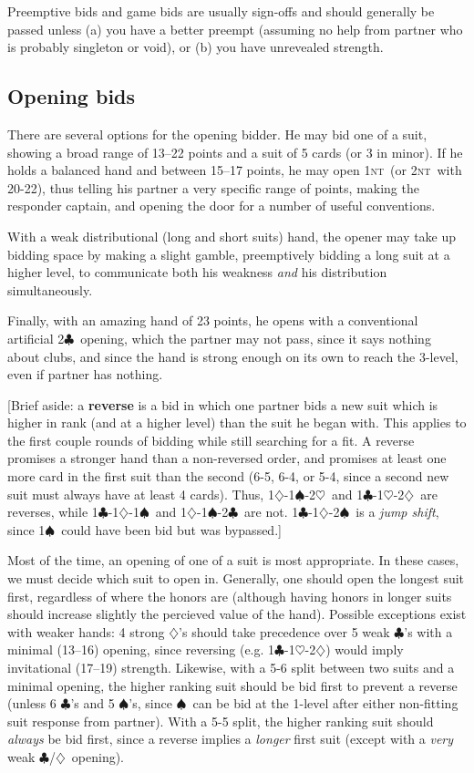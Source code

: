 \documentclass[11pt]{article}
\def\C{$\clubsuit$}
\def\D{$\diamondsuit$}
\def\H{$\heartsuit$}
\def\S{$\spadesuit$}
\def\NT{\textsc{nt}}
\begin{document}
Preemptive bids and game bids are usually sign-offs and should generally
be passed unless (a) you have a better preempt (assuming no
help from partner who is probably singleton or void), or (b) you have
unrevealed strength.

\subsection{Opening bids}
There are several options for the opening bidder.  He may bid one of a
suit, showing a broad range of 13--22 points and a suit of 5 cards (or
3 in minor).  If he holds a balanced hand and between 15--17 points,
he may open 1\NT\ (or 2\NT\ with 20-22), thus telling his partner a very
specific range of points, making the responder captain, and opening
the door for a number of useful conventions.

With a weak distributional (long and short suits) hand, 
the opener may take up bidding space by making a slight gamble, 
preemptively bidding a long suit at a higher level, to communicate
both his weakness \emph{and} his distribution simultaneously.

Finally, with an amazing hand of 23 points, he opens with a conventional
artificial 2\C\ opening, which the partner may not pass, since it
says nothing about clubs, and since the hand is strong enough on its
own to reach the 3-level, even if partner has nothing.

[Brief aside: a \textbf{reverse} is a bid in which one partner bids a
new suit which is higher in rank (and at a higher level) than the suit
he began with.  This applies to the first couple rounds of bidding
while still searching for a fit.  A reverse promises a stronger hand
than a non-reversed order, and promises at least one more card in the
first suit than the second (6-5, 6-4, or 5-4, since a second new suit
must always have at least 4 cards).  Thus, 1\D-1\S-2\H\ and 1\C-1\H-2\D\ 
are reverses, while 1\C-1\D-1\S\ and 1\D-1\S-2\C\ are not.  1\C-1\D-2\S\ 
is a \emph{jump shift}, since 1\S\ could have been bid but was bypassed.]

Most of the time, an opening of one of a suit is most appropriate.
In these cases, we must decide which suit to open in.  Generally, one
should open the longest suit first, regardless of where the honors are
(although having honors in longer suits should increase slightly the
percieved value of the hand).  Possible exceptions exist with weaker
hands: 4 strong \D's should take precedence over 5 weak \C's with a
minimal (13--16) opening, since reversing (e.g. 1\C-1\H-2\D) would imply
invitational (17--19) strength.  Likewise, with a 5-6 split between
two suits and a minimal opening, the higher ranking suit should be
bid first to prevent a reverse (unless 6 \C's and 5 \S's, since \S\ can
be bid at the 1-level after either non-fitting suit response from partner).
With a 5-5 split, the higher ranking suit should \emph{always} be bid first,
since a reverse implies a \emph{longer} first suit (except with a \emph{very}
weak \C/\D\ opening).
\end{document}
